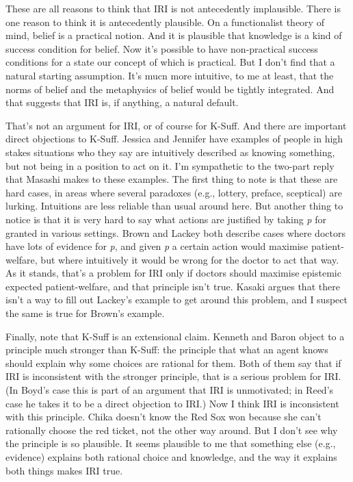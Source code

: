 These are all reasons to think that IRI is not antecedently implausible. There is one reason to think it is antecedently plausible. On a functionalist theory of mind, belief is a practical notion. And it is plausible that knowledge is a kind of success condition for belief. Now it's possible to have non-practical success conditions for a state our concept of which is practical. But I don't find that a natural starting assumption. It's mucn more intuitive, to me at least, that the norms of belief and the metaphysics of belief would be tightly integrated. And that suggests that IRI is, if anything, a natural default.

That's not an argument for IRI, or of course for K-Suff. And there are important direct objections to K-Suff. Jessica  \citet{Brown2008} and Jennifer  \citet{Lackey2010} have examples of people in high stakes situations who they say are intuitively described as knowing something, but not being in a position to act on it. I'm sympathetic to the two-part reply that Masashi  \citet{Kasaki2014} makes to these examples. The first thing to note is that these are hard cases, in areas where several paradoxes (e.g., lottery, preface, sceptical) are lurking. Intuitions are less reliable than usual around here. But another thing to notice is that it is very hard to say what actions are justified by taking \emph{p} for granted in various settings. Brown and Lackey both describe cases where doctors have lots of evidence for \emph{p}, and given \emph{p} a certain action would maximise patient-welfare, but where intuitively it would be wrong for the doctor to act that way. As it stands, that's a problem for IRI only if doctors should maximise epistemic expected patient-welfare, and that principle isn't true. Kasaki argues that there isn't a way to fill out Lackey's example to get around this problem, and I suspect the same is true for Brown's example.

Finally, note that K-Suff is an extensional claim. Kenneth  \citet{Boyd2015} and Baron  \citet{Reed2014} object to a principle much stronger than K-Suff: the principle that what an agent knows should explain why some choices are rational for them. Both of them say that if IRI is inconsistent with the stronger principle, that is a serious problem for IRI. (In Boyd's case this is part of an argument that IRI is unmotivated; in Reed's case he takes it to be a direct objection to IRI.) Now I think IRI is inconsistent with this principle. Chika doesn't know the Red Sox won because she can't rationally choose the red ticket, not the other way around. But I don't see why the principle is so plausible. It seems plausible to me that something else (e.g., evidence) explains both rational choice and knowledge, and the way it explains both things makes IRI true.

